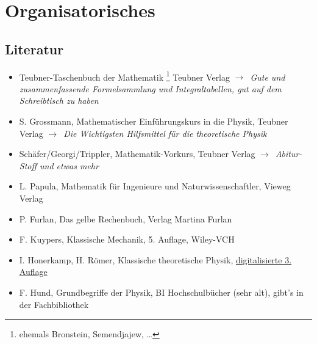 \documentclass[oneside]{book}
\theoremstyle{definition}
\newcommand{\conseq}{$\rightarrow$~}
\begin{document}
%
%
\chapter{Organisatorisches}

\section{Literatur}

\begin{itemize}
	\item Teubner-Taschenbuch der Mathematik \footnote{ehemals Bronstein, Semendjajew, \dots} Teubner Verlag \conseq \textit{Gute und zusammenfassende Formelsammlung und Integraltabellen, gut auf dem Schreibtisch zu haben}
	\item S. Grossmann, Mathematischer Einführungskurs in die Physik, Teubner Verlag \conseq \textit{Die Wichtigsten Hilfsmittel für die theoretische Physik}
	\item Schäfer/Georgi/Trippler, Mathematik-Vorkurs, Teubner Verlag \conseq \textit{Abitur-Stoff und etwas mehr}
	\item L. Papula, Mathematik für Ingenieure und Naturwissenschaftler, Vieweg Verlag
	\item P. Furlan, Das gelbe Rechenbuch, Verlag Martina Furlan
	\item F. Kuypers, Klassische Mechanik, 5. Auflage, Wiley-VCH
	\item I. Honerkamp, H. Römer, Klassische theoretische Physik, \href{http://www.freidok.uni-freiburg.de/volltexte/82/}{digitalisierte 3. Auflage}
	\item F. Hund, Grundbegriffe der Physik, BI Hochschulbücher (sehr alt), gibt's in der Fachbibliothek
\end{itemize}
\end{document}
